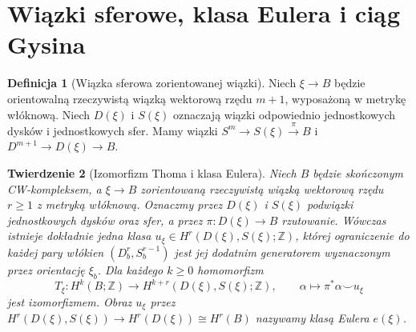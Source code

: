 \documentclass[11pt,a4paper,oneside]{report}
\newcommand{\Z}{\mathbb{Z}}
\theoremstyle{plain}
\newtheorem{twierdzenie}{Twierdzenie}[section]
\theoremstyle{definition}
\newtheorem{definicja}[twierdzenie]{Definicja}
\theoremstyle{remark}
\begin{document}
\section{Wiązki sferowe, klasa Eulera i ciąg Gysina}
\begin{definicja}[Wiązka sferowa zorientowanej wiązki]
Niech $\xi\to B$ będzie orientowalną rzeczywistą wiązką
wektorową rzędu $m+1$, wyposażoną w metrykę włóknową.
Niech $D(\xi)$ i $S(\xi)$ oznaczają wiązki odpowiednio
jednostkowych dysków i jednostkowych sfer. Mamy
wiązki $S^m\to S(\xi)\xrightarrow{\pi}B$ i
$D^{m+1}\to D(\xi)\to B$.
\end{definicja}
\begin{twierdzenie}[Izomorfizm Thoma i klasa Eulera]
\label{thm:thom-v5}
Niech $B$ będzie skończonym CW-kompleksem, a
$\xi\to B$ zorientowaną rzeczywistą wiązką wektorową
rzędu $r\ge1$ z metryką włóknową. Oznaczmy przez
$D(\xi)$ i $S(\xi)$ podwiązki jednostkowych dysków
oraz sfer, a przez $\pi:D(\xi)\to B$ rzutowanie.
Wówczas istnieje dokładnie jedna klasa
$u_\xi\in H^r(D(\xi),S(\xi);\Z)$, której ograniczenie
do każdej pary włókien $(D^r_b,S^{r-1}_b)$ jest
jej dodatnim generatorem wyznaczonym przez orientację
$\xi_b$. Dla każdego $k\ge0$ homomorfizm
\[
T_\xi:H^k(B;\Z)\longrightarrow
H^{k+r}(D(\xi),S(\xi);\Z),\qquad
\alpha\longmapsto\pi^*\alpha\smile u_\xi
\]
jest izomorfizmem. Obraz $u_\xi$ przez
$H^r(D(\xi),S(\xi))\to H^r(D(\xi))\cong H^r(B)$
nazywamy klasą Eulera $e(\xi)$.
\end{twierdzenie}
\end{document}
